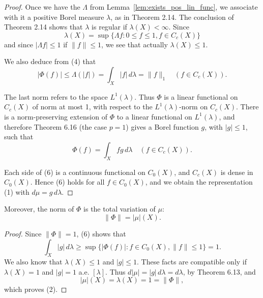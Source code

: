 \begin{proof}
  Once we have the $\Lambda$ from Lemma~\ref{lem:exists_pos_lin_func}, we associate with it a positive Borel measure $\lambda$, as in Theorem 2.14.
  The conclusion of Theorem 2.14 shows that $\lambda$ is regular if $\lambda(X) < \infty$.
  Since
  \begin{equation}
    \lambda(X) = \sup \{\Lambda f : 0 \leq f \leq 1, f \in C_c(X)\}
  \end{equation}
  and since $|\Lambda f| \leq 1$ if $\|f\| \leq 1$, we see that actually $\lambda(X) \leq 1$.

  We also deduce from (4) that
  \begin{equation}
    |\Phi(f)| \leq \Lambda(|f|) = \int_X |f| \, d\lambda = \|f\|_1 \quad (f \in C_c(X)). \tag{5}
  \end{equation}

  The last norm refers to the space $L^1(\lambda)$.
  Thus $\Phi$ is a linear functional on $C_c(X)$ of norm at most 1, with respect to the $L^1(\lambda)$-norm on $C_c(X)$.
  There is a norm-preserving extension of $\Phi$ to a linear functional on $L^1(\lambda)$, and therefore Theorem 6.16 (the case $p = 1$) gives a Borel function $g$, with $|g| \leq 1$, such that
  \begin{equation}
    \Phi(f) = \int_X fg \, d\lambda \quad (f \in C_c(X)). \tag{6}
  \end{equation}

  Each side of (6) is a continuous functional on $C_0(X)$, and $C_c(X)$ is dense in $C_0(X)$.
  Hence (6) holds for all $f \in C_0(X)$, and we obtain the representation (1) with $d\mu = g \, d\lambda$.
\end{proof}

\begin{lemma}[Rudin 6.19]
  \label{lem:norm_eq_variation}
  Moreover, the norm of $\Phi$ is the total variation of $\mu$:
  \begin{equation}
    \|\Phi\| = |\mu|(X). \tag{2}
  \end{equation}
\end{lemma}

\begin{proof}
  Since $\|\Phi\| = 1$, (6) shows that
  \begin{equation}
    \int_X |g| \, d\lambda \geq \sup \{|\Phi(f)| : f \in C_0(X), \|f\| \leq 1\} = 1. \tag{7}
  \end{equation}
  We also know that $\lambda(X) \leq 1$ and $|g| \leq 1$.
  These facts are compatible only if $\lambda(X) = 1$ and $|g| = 1$ a.e. $[\lambda]$.
  Thus $d|\mu| = |g| \, d\lambda = d\lambda$, by Theorem 6.13, and
  \begin{equation}
    |\mu|(X) = \lambda(X) = 1 = \|\Phi\|, \tag{8}
  \end{equation}
  which proves (2).
\end{proof}
